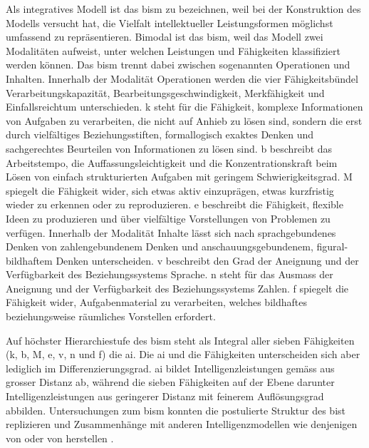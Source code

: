 \documentclass[11pt, twoside, a4paper]{book}		%
\begin{document}
Als integratives Modell ist das \gls{bism} zu bezeichnen, weil \citet{Jaeger1984} bei der Konstruktion des Modells versucht hat, die Vielfalt intellektueller Leistungsformen möglichst umfassend zu repräsentieren.
Bimodal ist das \gls{bism}, weil das Modell zwei Modalitäten aufweist, unter welchen Leistungen und Fähigkeiten klassifiziert werden können. 
Das \gls{bism} trennt dabei zwischen sogenannten Operationen und Inhalten. Innerhalb der Modalität Operationen werden die vier Fähigkeitsbündel Verarbeitungskapazität, Bearbeitungsgeschwindigkeit, Merkfähigkeit und Einfallsreichtum unterschieden. 
\gls{k} steht für die Fähigkeit, komplexe Informationen von Aufgaben zu verarbeiten, die nicht auf Anhieb zu lösen sind, sondern die erst durch vielfältiges Beziehungsstiften, formallogisch exaktes Denken und sachgerechtes Beurteilen von Informationen zu lösen sind. 
\gls{b} beschreibt das Arbeitstempo, die Auffassungsleichtigkeit und die Konzentrationskraft beim Lösen von einfach strukturierten Aufgaben mit geringem Schwierigkeitsgrad. 
\gls{M} spiegelt die Fähigkeit wider, sich etwas aktiv einzuprägen, etwas kurzfristig wieder zu erkennen oder zu reproduzieren. 
\gls{e} beschreibt die Fähigkeit, flexible Ideen zu produzieren und über vielfältige Vorstellungen von Problemen zu verfügen. 
Innerhalb der Modalität Inhalte lässt sich nach \citet{Jaeger1984} sprachgebundenes Denken von zahlengebundenem Denken und anschauungsgebundenem, figural-bildhaftem Denken unterscheiden.
\Gls{v} beschreibt den Grad der Aneignung und der Verfügbarkeit des Beziehungssystems Sprache.
\Gls{n} steht für das Ausmass der Aneignung und der Verfügbarkeit des Beziehungssystems Zahlen.
\Gls{f} spiegelt die Fähigkeit wider, Aufgabenmaterial zu verarbeiten, welches bildhaftes beziehungsweise räumliches Vorstellen erfordert.

Auf höchster Hierarchiestufe des \gls{bism} steht als Integral aller sieben Fähigkeiten (\gls{k}, \gls{b}, \gls{M}, \gls{e}, \gls{v}, \gls{n} und \gls{f}) die \gls{ai}. Die \gls{ai} und die Fähigkeiten unterscheiden sich aber lediglich im Differenzierungsgrad. \gls{ai} bildet Intelligenzleistungen gemäss \citet{Jaeger1984} aus grosser Distanz ab, während die sieben Fähigkeiten auf der Ebene darunter Intelligenzleistungen aus geringerer Distanz mit feinerem Auflösungsgrad abbilden. Untersuchungen zum \gls{bism} konnten die postulierte Struktur des \gls{bist} replizieren  und Zusammenhänge mit anderen Intelligenzmodellen wie denjenigen von \citet{Cattell1971}  oder von \citet{Carroll1993} herstellen \citep{Bucik1996, Beauducel2002, Suess2002}.
\end{document}
